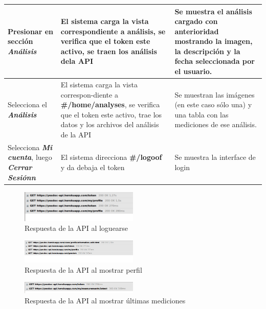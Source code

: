 \documentclass[a4paper,12pt]{article}
\begin{document}
\begin{longtable}{|p{5cm}|p{5cm}|p{5cm}|}
Presionar en sección \textit{\textbf{Análisis }} 
& El sistema carga la vista correspondiente a análisis, se verifica que el token este activo, se traen los análisis dela API
& Se muestra el análisis cargado con anterioridad mostrando la imagen, la descripción y la fecha seleccionada por el usuario.
\\ \hline






Selecciona el \textit{\textbf{Análisis}}
& El sistema carga la vista correspon-diente a \textbf{ \#/home/analyses}, se verifica que el token este activo, trae los datos y los archivos del análisis de la API
& Se muestran las imágenes (en este caso sólo una) y una tabla con las mediciones de ese análisis.
\\ \hline




Selecciona \textit{\textbf{Mi cuenta}}, luego \textit{\textbf{Cerrar Sesiónn}}
& El sistema direcciona \textbf{\#/logoof }y da debaja el token
& Se muestra la interface de login

\\ \hline


\end{longtable}







    \begin{figure}[h]
        \centering
        \includegraphics[width=0.5\textwidth]{img/5-login}
        \caption{Respuesta de la API al loguearse}
		\label{5-login}
    \end{figure}
    
        \begin{figure}[h]
        \centering
        \includegraphics[width=0.5\textwidth]{img/5-perfil}
        \caption{Respuesta de la API al mostrar perfil}
		\label{5-perfil}
    \end{figure}
    
        \begin{figure}[h]
        \centering
        \includegraphics[width=0.5\textwidth]{img/5-resumen}
        \caption{Respuesta de la API al mostrar últimas mediciones}
		\label{5-resumen}
    \end{figure}
    
\end{document}
